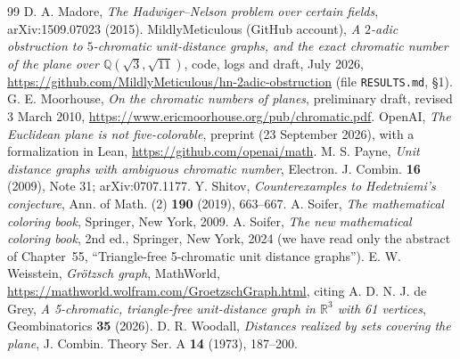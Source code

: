 \documentclass[11pt,a4paper]{amsart}
\theoremstyle{definition}
\newcommand{\Q}{\mathbb{Q}}
\newcommand{\R}{\mathbb{R}}
\begin{document}
\begin{thebibliography}{99}
 D. A. Madore, \emph{The Hadwiger--Nelson problem over certain fields}, arXiv:1509.07023 (2015).
 MildlyMeticulous (GitHub account), \emph{A $2$-adic obstruction to $5$-chromatic unit-distance
graphs, and the exact chromatic number of the plane over $\Q(\sqrt3,\sqrt{11})$}, code, logs and draft, July 2026,
\url{https://github.com/MildlyMeticulous/hn-2adic-obstruction} (file \texttt{RESULTS.md}, \S1).
 G. E. Moorhouse, \emph{On the chromatic numbers of planes}, preliminary draft, revised
3 March 2010, \url{https://www.ericmoorhouse.org/pub/chromatic.pdf}.
 OpenAI, \emph{The Euclidean plane is not five-colorable}, preprint (23 September 2026), with a
formalization in Lean, \url{https://github.com/openai/math}.
 M. S. Payne, \emph{Unit distance graphs with ambiguous chromatic number}, Electron. J. Combin.
\textbf{16} (2009), Note 31; arXiv:0707.1177.
 Y. Shitov, \emph{Counterexamples to Hedetniemi's conjecture}, Ann. of Math. (2) \textbf{190}
(2019), 663--667.
 A. Soifer, \emph{The mathematical coloring book}, Springer, New York, 2009.
 A. Soifer, \emph{The new mathematical coloring book}, 2nd ed., Springer, New York, 2024
(we have read only the abstract of Chapter~55, ``Triangle-free 5-chromatic unit distance graphs'').
 E. W. Weisstein, \emph{Gr\"otzsch graph}, MathWorld, \url{https://mathworld.wolfram.com/GroetzschGraph.html},
citing A. D. N. J. de Grey, \emph{A 5-chromatic, triangle-free unit-distance graph in $\R^3$ with 61 vertices},
Geombinatorics \textbf{35} (2026).
 D. R. Woodall, \emph{Distances realized by sets covering the plane}, J. Combin. Theory Ser. A
\textbf{14} (1973), 187--200.
\end{thebibliography}
\end{document}
